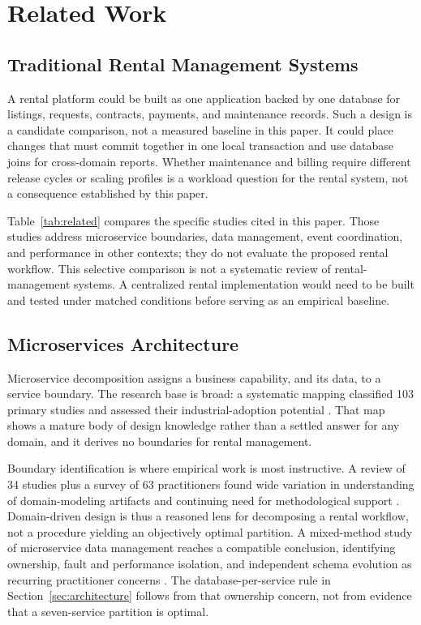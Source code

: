 \section{Related Work}\label{sec:related}

\subsection{Traditional Rental Management Systems}
A rental platform could be built as one application backed by one database for listings, requests, contracts, payments, and maintenance records. Such a design is a candidate comparison, not a measured baseline in this paper. It could place changes that must commit together in one local transaction and use database joins for cross-domain reports. Whether maintenance and billing require different release cycles or scaling profiles is a workload question for the rental system, not a consequence established by this paper.

Table~\ref{tab:related} compares the specific studies cited in this paper. Those studies address microservice boundaries, data management, event coordination, and performance in other contexts; they do not evaluate the proposed rental workflow. This selective comparison is not a systematic review of rental-management systems. A centralized rental implementation would need to be built and tested under matched conditions before serving as an empirical baseline.

\subsection{Microservices Architecture}
Microservice decomposition assigns a business capability, and its data, to a service boundary. The research base is broad: a systematic mapping classified 103 primary studies and assessed their industrial-adoption potential \cite{dipfrancesco2019architecting}. That map shows a mature body of design knowledge rather than a settled answer for any domain, and it derives no boundaries for rental management.

Boundary identification is where empirical work is most instructive. A review of 34 studies plus a survey of 63 practitioners found wide variation in understanding of domain-modeling artifacts and continuing need for methodological support \cite{zhong2024ddd}. Domain-driven design is thus a reasoned lens for decomposing a rental workflow, not a procedure yielding an objectively optimal partition. A mixed-method study of microservice data management reaches a compatible conclusion, identifying ownership, fault and performance isolation, and independent schema evolution as recurring practitioner concerns \cite{laigner2021datamanagement}. The database-per-service rule in Section~\ref{sec:architecture} follows from that ownership concern, not from evidence that a seven-service partition is optimal.

